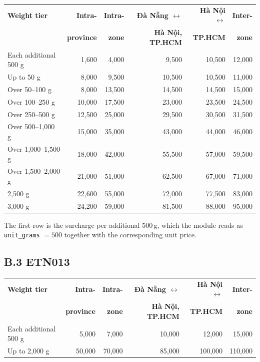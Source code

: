 \begin{table}[H]
\centering
\small
\setlength{\tabcolsep}{4pt}
\begin{tabular}{lrrrrr}
\hline
\textbf{Weight tier} & \textbf{Intra-} & \textbf{Intra-} & \textbf{Đà Nẵng $\leftrightarrow$} & \textbf{Hà Nội $\leftrightarrow$} & \textbf{Inter-} \\
 & \textbf{province} & \textbf{zone} & \textbf{Hà Nội, TP.HCM} & \textbf{TP.HCM} & \textbf{zone} \\
\hline
Each additional 500 g & 1,600 & 4,000 & 9,500 & 10,500 & 12,000 \\
\hline
Up to 50 g & 8,000 & 9,500 & 10,500 & 10,500 & 11,000 \\
Over 50--100 g & 8,000 & 13,500 & 14,500 & 14,500 & 15,000 \\
Over 100--250 g & 10,000 & 17,500 & 23,000 & 23,500 & 24,500 \\
Over 250--500 g & 12,500 & 25,000 & 29,500 & 30,500 & 31,500 \\
Over 500--1,000 g & 15,000 & 35,000 & 43,000 & 44,000 & 46,000 \\
Over 1,000--1,500 g & 18,000 & 42,000 & 55,500 & 57,000 & 59,500 \\
Over 1,500--2,000 g & 21,000 & 51,000 & 62,500 & 67,000 & 71,000 \\
2,500 g & 22,600 & 55,000 & 72,000 & 77,500 & 83,000 \\
3,000 g & 24,200 & 59,000 & 81,500 & 88,000 & 95,000 \\
\hline
\end{tabular}
\end{table}

\noindent The first row is the surcharge per additional 500\,g, which the module reads as \texttt{unit\_grams} $=500$ together with the corresponding unit price.

\subsection*{B.3 ETN013}

\begin{table}[H]
\centering
\small
\setlength{\tabcolsep}{4pt}
\begin{tabular}{lrrrrr}
\hline
\textbf{Weight tier} & \textbf{Intra-} & \textbf{Intra-} & \textbf{Đà Nẵng $\leftrightarrow$} & \textbf{Hà Nội $\leftrightarrow$} & \textbf{Inter-} \\
 & \textbf{province} & \textbf{zone} & \textbf{Hà Nội, TP.HCM} & \textbf{TP.HCM} & \textbf{zone} \\
\hline
Each additional 500 g & 5,000 & 7,000 & 10,000 & 12,000 & 15,000 \\
\hline
Up to 2,000 g & 50,000 & 70,000 & 85,000 & 100,000 & 110,000 \\
\hline
\end{tabular}
\end{table}

